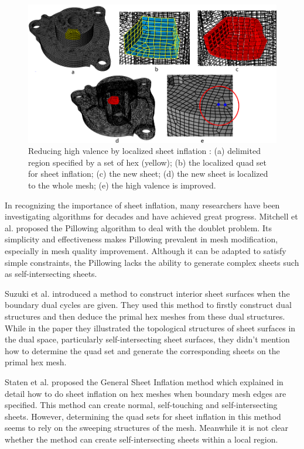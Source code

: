 \documentclass[final,5p,times,twocolumn]{elsarticle}
\begin{document}
\begin{figure}[htbp]
\begin{center}
\includegraphics[width=15cm]{intro_high_val_localized_inf.png}
\caption{Reducing high valence by localized sheet inflation : (a) delimited region specified by a set of hex (yellow); (b) the localized quad set for sheet inflation; (c) the new sheet; (d) the new sheet is localized to the whole mesh; (e) the high valence is improved.}
\label{fig:intro_high_val_localized_inf}
\end{center}
\end{figure}

In recognizing the importance of sheet inflation, many researchers have been investigating algorithms for decades and have achieved great progress. Mitchell et al. proposed the Pillowing algorithm to deal with the doublet problem\cite{Mitchell:1995wa}.  Its simplicity and effectiveness makes Pillowing prevalent in mesh modification, especially in mesh quality improvement. Although it can be adapted to satisfy simple constraints, the Pillowing lacks the ability to generate complex sheets such as self-intersecting sheets.

Suzuki et al. introduced a method to construct interior sheet surfaces when the boundary dual cycles are given\cite{Suzuki:2010hn}. They used this method to firstly construct dual structures and then deduce the primal hex meshes from these dual structures. While in the paper they illustrated the topological structures of sheet surfaces in the dual space, particularly self-intersecting sheet surfaces, they didn't mention how to determine the quad set and generate the corresponding sheets on the primal hex mesh.

Staten et al. proposed the General Sheet Inflation method which explained in detail how to do sheet inflation on hex meshes when boundary mesh edges are specified\cite{Staten:2009bo}. This method can create normal, self-touching and self-intersecting sheets. However, determining the quad sets for sheet inflation in this method seems to rely on the sweeping structures of the mesh. Meanwhile it is not clear whether the method can create self-intersecting sheets within a local region.
\end{document}
